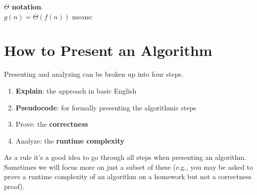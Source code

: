 \documentclass[11  pt]{article}
\begin{document}
\begin{definition}\textbf{$\Theta$ notation}.\\
	
	$g(n) = \Theta(f(n))$  means:\\
	
	\vs{3cm}
	
	
	
\end{definition}
%
%
%
%
%
%
\newpage


\section{How to Present an Algorithm}
Presenting and analyzing can be broken up into four steps.
\begin{enumerate}
	\item \textbf{Explain}: the approach in basic English
	\item \textbf{Pseudocode}: for formally presenting the algorithmic steps
	\item {Prove}: the \textbf{correctness}
	\item {Analyze}: the \textbf{runtime complexity}
\end{enumerate}
As a rule it's a good idea to go through all steps when presenting an algorithm. Sometimes we will focus more on just a subset of these (e.g., you may be asked to prove a runtime complexity of an algorithm on a homework but not a correctness proof). \\ 
\end{document}
